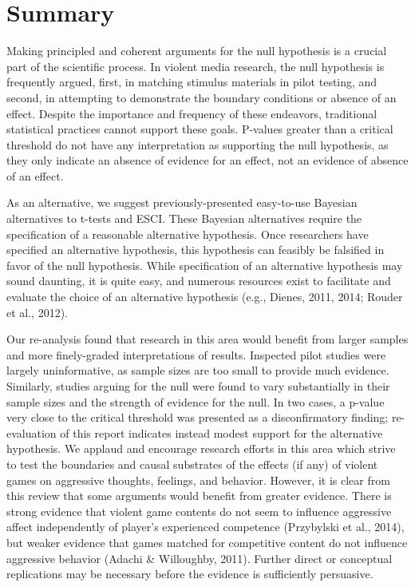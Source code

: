 \documentclass{article}
\begin{document}
\section{Summary} %
Making principled and coherent arguments for the null hypothesis is a crucial part of the scientific process. In violent media research, the null hypothesis is frequently argued, first, in matching stimulus materials in pilot testing, and second, in attempting to demonstrate the boundary conditions or absence of an effect. Despite the importance and frequency of these endeavors, traditional statistical practices cannot support these goals. P-values greater than a critical threshold do not have any interpretation as supporting the null hypothesis, as they only indicate an absence of evidence for an effect, not an evidence of absence of an effect.

As an alternative, we suggest previously-presented easy-to-use Bayesian alternatives to t-tests and ESCI. These Bayesian alternatives require the specification of a reasonable alternative hypothesis. Once researchers have specified an alternative hypothesis, this hypothesis can feasibly be falsified in favor of the null hypothesis. While specification of an alternative hypothesis may sound daunting, it is quite easy, and numerous resources exist to facilitate and evaluate the choice of an alternative hypothesis (e.g., Dienes, 2011, 2014; Rouder et al., 2012).

Our re-analysis found that research in this area would benefit from larger samples and more finely-graded interpretations of results. Inspected pilot studies were largely uninformative, as sample sizes are too small to provide much evidence. Similarly, studies arguing for the null were found to vary substantially in their sample sizes and the strength of evidence for the null. In two cases, a p-value very close to the critical threshold was presented as a disconfirmatory finding; re-evaluation of this report indicates instead modest support for the alternative hypothesis. We applaud and encourage research efforts in this area which strive to test the boundaries and causal substrates of the effects (if any) of violent games on aggressive thoughts, feelings, and behavior. However, it is clear from this review that some arguments would benefit from greater evidence. There is strong evidence that violent game contents do not seem to influence aggressive affect independently of player’s experienced competence (Przybylski et al., 2014), but weaker evidence that games matched for competitive content do not influence aggressive behavior (Adachi \& Willoughby, 2011). Further direct or conceptual replications may be necessary before the evidence is sufficiently persuasive. 
\end{document}
